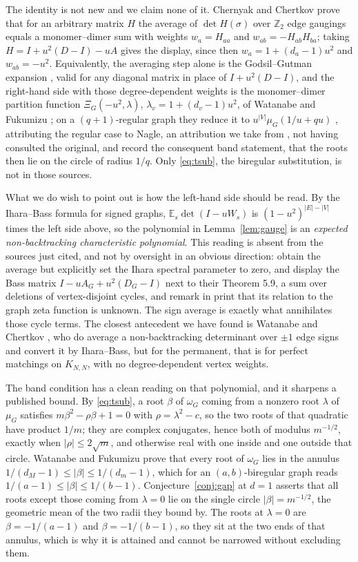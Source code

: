 \documentclass[11pt]{article}
\theoremstyle{remark}
\begin{document}
The identity is not new and we claim none of it. Chernyak and Chertkov
\cite[Eqs.~(2),~(6)]{CC} prove that for an arbitrary matrix $H$ the average of
$\det H(\sigma)$ over $\mathbb Z_2$ edge gaugings equals a monomer--dimer sum with
weights $w_a=H_{aa}$ and $w_{ab}=-H_{ab}H_{ba}$; taking $H=I+u^2(D-I)-uA$ gives
the display, since then $w_a=1+(d_a-1)u^2$ and $w_{ab}=-u^2$. Equivalently, the
averaging step alone is the Godsil--Gutman expansion \cite{GG}, valid for any
diagonal matrix in place of $I+u^2(D-I)$, and the right-hand side with those
degree-dependent weights is the monomer--dimer partition function
$\Xi_G(-u^2,\lambda)$, $\lambda_v=1+(d_v-1)u^2$, of Watanabe and Fukumizu
\cite[Thm.~5.5]{WF}; on a $(q+1)$-regular graph they reduce it to
$u^{|V|}\mu_G(1/u+qu)$ \cite[Eq.~(5.3)]{WF}, attributing the regular case to
Nagle, an attribution we take from \cite{WF}, not having consulted the
original, and record the consequent band statement, that the roots then lie on
the
circle of radius $1/q$. Only \eqref{eq:tsub}, the biregular substitution, is not
in those sources.

What we do wish to point out is how the left-hand side should be read. By the
Ihara--Bass formula for signed graphs, $\mathbb E_s\det(I-uW_s)$ is
$(1-u^2)^{|E|-|V|}$ times the left side above, so the polynomial in
Lemma~\ref{lem:gauge} is an \emph{expected non-backtracking characteristic
polynomial}. This reading is absent from the sources just cited, and not by
oversight in an obvious direction: \cite{CC} obtain the average but explicitly set
the Ihara spectral parameter to zero, and \cite{WF} display the Bass matrix
$I-uA_G+u^2(D_G-I)$ next to their Theorem 5.9, a sum over deletions of
vertex-disjoint cycles, and remark in print that its relation to the graph zeta
function is unknown. The sign average is exactly what annihilates those cycle
terms. The closest antecedent we have found is Watanabe and Chertkov
\cite[Thm.~4]{WC}, who do average a non-backtracking determinant over $\pm1$ edge
signs and convert it by Ihara--Bass, but for the permanent, that is for perfect
matchings on $K_{N,N}$, with no degree-dependent vertex weights.

The band condition has a clean reading on that polynomial, and it sharpens a
published bound. By \eqref{eq:tsub}, a root $\beta$ of $\omega_G$ coming from a
nonzero root $\lambda$ of $\mu_G$ satisfies $m\beta^2-\rho\beta+1=0$ with
$\rho=\lambda^2-c$, so the two roots of that quadratic have product $1/m$; they are
complex conjugates, hence both of modulus $m^{-1/2}$, exactly when
$|\rho|\le2\sqrt m$, and otherwise real with one inside and one outside that circle.
Watanabe and Fukumizu prove \cite[Cor.~5.8]{WF} that every root of $\omega_G$ lies
in the annulus $1/(d_M-1)\le|\beta|\le1/(d_m-1)$, which for an $(a,b)$-biregular
graph reads $1/(a-1)\le|\beta|\le1/(b-1)$. Conjecture~\ref{conj:gap} at $d=1$
asserts that all roots except those coming from $\lambda=0$ lie on the single
circle $|\beta|=m^{-1/2}$, the geometric mean of the two radii they bound by. The
roots at $\lambda=0$ are $\beta=-1/(a-1)$ and $\beta=-1/(b-1)$, so they sit at the
two ends of that annulus, which is why it is attained and cannot be narrowed
without excluding them.
\end{document}
